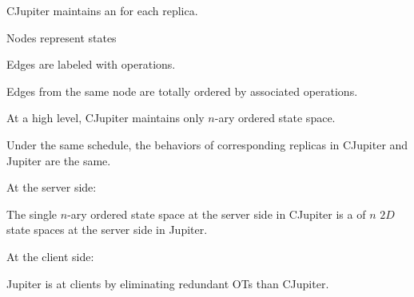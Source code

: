 
\begin{frame}{}
  \centerline{\Huge {}}
\end{frame}

\begin{frame}{}
  \begin{center}
    {\large CJupiter maintains an  for each replica.}
  \end{center}


  \begin{center}
     Nodes represent states

     Edges are labeled with operations.

     Edges from the same node are totally ordered by associated operations.
  \end{center}
\end{frame}

\begin{frame}{}
  \begin{center}
    \begin{prop}[$n + 1 \to 1$ (Informal)]
      {\large At a high level, CJupiter maintains only  $n$-ary ordered state space.}
    \end{prop}

    \resizebox{0.50\textwidth}{!}{}

  \end{center}
\end{frame}

\begin{frame}{}
  \begin{Theorem}[Equivalence]
    Under the same schedule, the behaviors of corresponding replicas in CJupiter and Jupiter are the same.
  \end{Theorem}

  \pause
  \vspace{0.30cm}
  \centerline{\large At the server side:}
  \begin{prop}
    The single $n$-ary ordered state space at the server side in CJupiter 
    is a  of $n$ $2D$ state spaces at the server side in Jupiter.
  \end{prop}

  \pause
  \vspace{0.30cm}
  \centerline{\large At the client side:}
  \begin{prop}
    Jupiter is  at clients by eliminating redundant OTs than CJupiter.
  \end{prop}
\end{frame}
